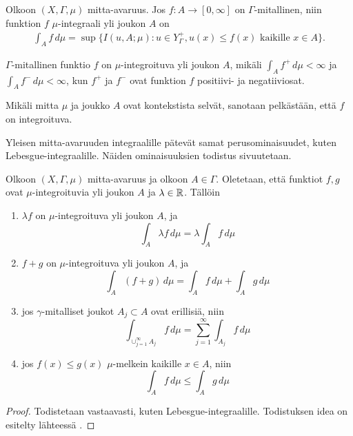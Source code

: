 \documentclass[12pt,oneside,a4paper]{amsbook} %
\begin{document}
\begin{definition}
    Olkoon $(X, \Gamma, \mu)$ mitta-avaruus. Jos $f: A \to [0, \infty]$ on $\Gamma$-mitallinen, niin funktion $f$ $\mu$-integraali yli joukon $A$ on
    \begin{align*}
        \int_A f \, d\mu = \sup\{I(u, A; \mu) : u \in Y_\Gamma^+, u(x) \le f(x) \text{ kaikille } x \in A\}.
    \end{align*}
\end{definition}

\begin{definition}
    $\Gamma$-mitallinen funktio $f$ on $\mu$-integroituva yli joukon $A$, mikäli $\int_A f^+ \, d\mu < \infty$ ja $\int_A f^-\, d\mu < \infty$, kun $f^+$ ja $f^-$ ovat funktion $f$ positiivi- ja negatiiviosat.
\end{definition}
Mikäli mitta $\mu$ ja joukko $A$ ovat kontekstista selvät, sanotaan pelkästään, että $f$ on integroituva.

Yleisen mitta-avaruuden integraalille pätevät samat perusominaisuudet, kuten Lebesgue-integraalille. Näiden ominaisuuksien todistus sivuutetaan.
\begin{lemma}\label{le:integralProperties}
    Olkoon $(X, \Gamma, \mu)$ mitta-avaruus ja olkoon $A\in \Gamma$. Oletetaan, että funktiot $f, g$ ovat $\mu$-integroituvia yli joukon $A$ ja $\lambda \in \mathbb{R}$. Tällöin
    \begin{enumerate}
        \item $\lambda f$ on $\mu$-integroituva yli joukon $A$, ja 
        \begin{equation*}
            \int_A \lambda f \, d\mu = \lambda \int_A f \, d\mu
        \end{equation*}
        \item $f + g$ on $\mu$-integroituva yli joukon $A$, ja
        \begin{equation*}
            \int_A  (f+g) \, d\mu = \int_A  f \, d\mu + \int_A  g \, d\mu
        \end{equation*}
        \item jos $\gamma$-mitalliset joukot $A_j \subset A$ ovat erillisiä, niin
        \begin{equation*}
            \int_{\cup_{j=1}^\infty A_j}f \, d\mu = \sum_{j=1}^\infty \int_{A_j} f\, d\mu
        \end{equation*}
        \item jos $f(x) \le g(x)$ $\mu$-melkein kaikille $x \in A$, niin 
        \begin{equation*}
            \int_A f \, d\mu \le \int_A g \, d\mu
        \end{equation*}
    \end{enumerate}
\end{lemma}
\begin{proof}
    Todistetaan vastaavasti, kuten Lebesgue-integraalille. Todistuksen idea on esitelty lähteessä \cite[s.113]{lehrbäck}.
\end{proof}
\end{document}
